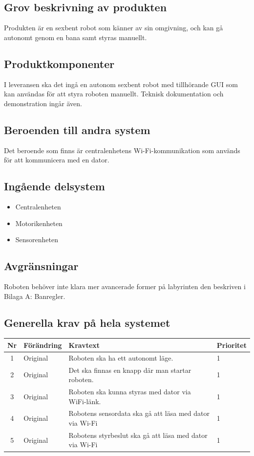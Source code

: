 \documentclass[a4paper,titlepage,12pt]{article}
\begin{document}
	\subsection{Grov beskrivning av produkten}
	Produkten är en sexbent robot som känner av sin omgivning, och kan gå autonomt
	genom en bana samt styras manuellt.
	\subsection{Produktkomponenter}
	I leveransen ska det ingå en autonom sexbent robot med tillhörande GUI som kan användas för att 
	styra roboten manuellt. Teknisk dokumentation och demonstration ingår även. 
	\subsection{Beroenden  till andra system}
	Det beroende som finns är centralenhetens Wi-Fi-kommunikation som används för 
	att kommunicera med en dator.
	\subsection{Ingående delsystem}
    \begin{itemize}
        \item Centralenheten
        \item Motorikenheten
        \item Sensorenheten
    \end{itemize}
	\subsection{Avgränsningar}
	Roboten behöver inte klara mer avancerade former på labyrinten den beskriven i Bilaga A: Banregler.
	\subsection{Generella krav på hela systemet}

	\begin{table}[h!]
		\label{tab:label}
		\begin{tabularx}{\textwidth}{|c|l|X|l|}
		\hline
			\textbf{Nr} & \textbf{Förändring} & \textbf{Kravtext} & \textbf{Prioritet} 
				\\ \hline
	
			1 & Original & Roboten ska ha ett autonomt läge. & 1
					\\ \hline

			2 & Original & Det ska finnas en knapp där man startar roboten. & 1
				\\ \hline

			3 & Original & Roboten ska kunna styras med dator via WiFi-länk. & 1
				\\ \hline
		
			4 & Original & Robotens sensordata ska gå att läsa med dator via Wi-Fi & 1
				\\ \hline

			5 & Original & Robotens styrbeslut ska gå att läsa med dator via Wi-Fi & 1
				\\ \hline
		\end{tabularx}
	\end{table}
\end{document}
